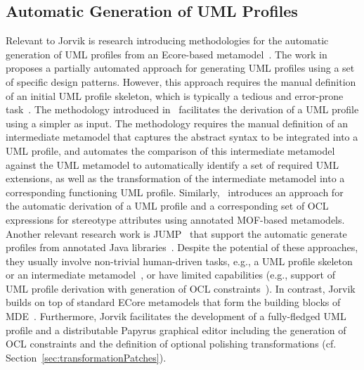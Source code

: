 \subsection{Automatic Generation of UML Profiles}
Relevant to Jorvik is research introducing methodologies for the automatic 
generation of UML profiles from an Ecore-based metamodel~\cite{Kraas17}. 
The work in~\cite{Lagarde2008:FASE} proposes a partially automated approach for 
generating UML profiles using a set of specific design patterns. However, this 
approach requires the manual definition of an initial UML profile skeleton, 
which is typically a tedious and error-prone task~\cite{Wimmer2009:IJWIS}. 
The methodology introduced in~\cite{Giachetti2008:ER,Giachetti2009:CAISE} 
facilitates the derivation of a UML profile using a simpler as input.
The methodology requires the manual definition of an intermediate metamodel 
that captures the abstract syntax to be integrated into a UML profile, and 
automates the comparison of this intermediate metamodel against the UML 
metamodel to automatically identify a set of required UML extensions, as well 
as the transformation of the intermediate metamodel into a corresponding 
functioning UML profile. 
Similarly,~\cite{Kraas17} introduces an approach for the automatic derivation of a UML profile and a corresponding set of OCL expressions
for stereotype attributes using annotated MOF-based metamodels.
Another relevant research work is JUMP~\cite{Bergmayr2014:MODELS} that support the automatic generate profiles from annotated Java libraries~\cite{Bergmayr2014:MODELS}.
Despite the potential of these approaches, they usually involve
non-trivial human-driven tasks, e.g., a UML profile 
skeleton~\cite{Lagarde2008:FASE} or an intermediate 
metamodel~\cite{Giachetti2008:ER,Giachetti2009:CAISE}, or have limited capabilities (e.g., support of UML profile derivation with generation of OCL constraints~\cite{Kraas17}). In contrast, Jorvik builds on top of standard ECore metamodels that form the building blocks of MDE~\cite{omg2014meta}. 
Furthermore, Jorvik facilitates the development of a fully-fledged UML profile and a distributable Papyrus graphical editor including the generation of OCL constraints and the definition of optional polishing transformations (cf. 
Section~\ref{sec:transformationPatches}).


